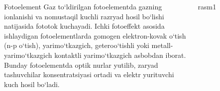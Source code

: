 \documentclass{beamer}
\begin{document}
\begin{frame}
	\begin{columns}[T]
		\begin{column}{.5\textwidth}
			\begin{block}{Fotoelement}
				Gaz to`ldirilgan fotoelementda gazning ionlanishi va nomustaqil kuchli razryad hosil bo`lishi natijasida fototok kuchayadi. Ichki fotoeffekt asosida ishlaydigan fotoelementlarda gomogen elektron-kovak o`tish (n-p o`tish), yarimo`tkazgich, geteroo`tishli yoki metall-yarimo`tkazgich kontaktli yarimo`tkazgich asbobdan iborat. Bunday fotoelementda optik nurlar yutilib, zaryad tashuvchilar konsentratsiyasi ortadi va elektr yurituvchi kuch hosil bo`ladi. 
			\end{block}
		\end{column}
		\begin{column}{.5\textwidth}
			\begin{block}{rasm1}
				\begin{figure}
					\centering
					\begin{figure}
						\centering
						\includegraphics[width=0.7\linewidth]{9kd2f}
						\caption{}
						\label{fig:9kd2f}
					\end{figure}
				\end{figure}
			\end{block}
		\end{column}
	\end{columns}
\end{frame}
\end{document}
